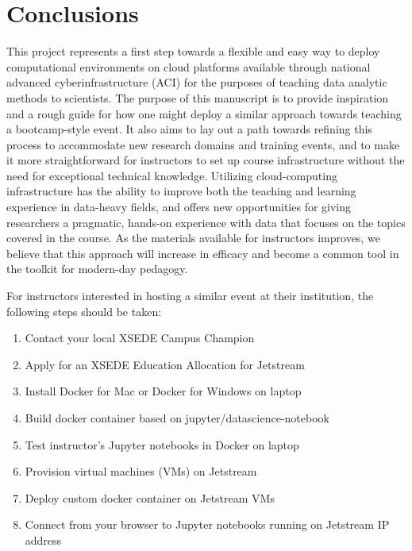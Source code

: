 \section{Conclusions}

This project represents a first step towards a flexible and easy way to deploy
computational environments on cloud platforms available through national
advanced cyberinfrastructure (ACI) for the purposes of teaching data analytic
methods to scientists. The purpose of this manuscript is to provide inspiration
and a rough guide for how one might deploy a similar approach towards teaching a
bootcamp-style event. It also aims to lay out a path towards refining this
process to accommodate new research domains and training events, and to make it
more straightforward for instructors to set up course infrastructure without the
need for exceptional technical knowledge. Utilizing cloud-computing
infrastructure has the ability to improve both the teaching and learning
experience in data-heavy fields, and offers new opportunities for giving
researchers a pragmatic, hands-on experience with data that focuses on the
topics covered in the course. As the materials available for instructors
improves, we believe that this approach will increase in efficacy and become a
common tool in the toolkit for modern-day pedagogy.

For instructors interested in hosting a similar event at their institution, the
following steps should be taken:

\begin{enumerate}
\item Contact your local XSEDE Campus Champion
\item Apply for an XSEDE Education Allocation for Jetstream
\item Install Docker for Mac or Docker for Windows on laptop
\item Build docker container based on jupyter/datascience-notebook
\item Test instructor's Jupyter notebooks in Docker on laptop
\item Provision virtual machines (VMs) on Jetstream
\item Deploy custom docker container on Jetstream VMs
\item Connect from your browser to Jupyter notebooks running on Jetstream IP address
\end{enumerate}
